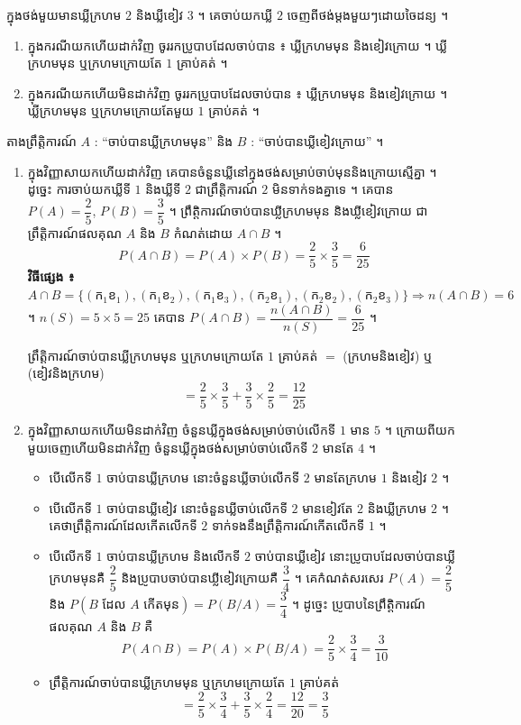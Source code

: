 \begin{example}[លំហាត់គំរូ]
ក្នុងថង់មួយមានឃ្លីក្រហម $2$ និងឃ្លីខៀវ $3$ ។ គេចាប់យកឃ្លី $2$ ចេញពីថង់ម្ដងមួយៗដោយចៃដន្យ ។
\begin{enumerate}[a]
  \item ក្នុងករណីយកហើយដាក់វិញ ចូររកប្រូបាបដែលចាប់បាន ៖ ឃ្លីក្រហមមុន និងខៀវក្រោយ ។ ឃ្លីក្រហមមុន ឬក្រហមក្រោយតែ $1$ គ្រាប់គត់ ។
  \item ក្នុងករណីយកហើយមិនដាក់វិញ ចូររកប្រូបាបដែលចាប់បាន ៖ ឃ្លីក្រហមមុន និងខៀវក្រោយ ។ ឃ្លីក្រហមមុន ឬក្រហមក្រោយតែមួយ $1$ គ្រាប់គត់ ។
\end{enumerate}
\ans
តាងព្រឹត្តិការណ៍ $A$ : “ចាប់បានឃ្លីក្រហមមុន” និង $B$ : “ចាប់បានឃ្លីខៀវក្រោយ” ។
\begin{enumerate}[a]
  \item ក្នុងវិញ្ញាសាយកហើយដាក់វិញ គេបានចំនួនឃ្លីនៅក្នុងថង់សម្រាប់ចាប់មុននិងក្រោយស្មើគ្នា ។ ដូច្នេះ ការចាប់យកឃ្លីទី $1$ និងឃ្លីទី $2$ ជាព្រឹត្តិការណ៍ $2$ មិនទាក់ទងគ្នាទេ ។ គេបាន $P(A) = \dfrac{2}{5}$, $P(B) = \dfrac{3}{5}$ ។ ព្រឹត្តិការណ៍ចាប់បានឃ្លីក្រហមមុន និងឃ្លីខៀវក្រោយ ជាព្រឹត្តិការណ៍ផលគុណ $A$ និង $B$ កំណត់ដោយ $A \cap B$ ។
  \[
  P(A \cap B) = P(A)\times P(B) = \frac{2}{5}\times\frac{3}{5} = \frac{6}{25}
  \]
  \textbf{វិធីផ្សេង ៖} $A \cap B = \{(\text{ក}_1\text{ខ}_1), (\text{ក}_1\text{ខ}_2), (\text{ក}_1\text{ខ}_3), (\text{ក}_2\text{ខ}_1), (\text{ក}_2\text{ខ}_2), (\text{ក}_2\text{ខ}_3)\} \Rightarrow n(A \cap B) = 6$ ។ $n(S) = 5\times 5 = 25$ គេបាន $P(A \cap B) = \dfrac{n(A \cap B)}{n(S)} = \dfrac{6}{25}$ ។

  ព្រឹត្តិការណ៍ចាប់បានឃ្លីក្រហមមុន ឬក្រហមក្រោយតែ $1$ គ្រាប់គត់ $=$ (ក្រហមនិងខៀវ) ឬ (ខៀវនិងក្រហម)
  \[
  = \frac{2}{5}\times\frac{3}{5} + \frac{3}{5}\times\frac{2}{5} = \frac{12}{25}
  \]
  \item ក្នុងវិញ្ញាសាយកហើយមិនដាក់វិញ ចំនួនឃ្លីក្នុងថង់សម្រាប់ចាប់លើកទី $1$ មាន $5$ ។ ក្រោយពីយកមួយចេញហើយមិនដាក់វិញ ចំនួនឃ្លីក្នុងថង់សម្រាប់ចាប់លើកទី $2$ មានតែ $4$ ។
  \begin{itemize}
    \item បើលើកទី $1$ ចាប់បានឃ្លីក្រហម នោះចំនួនឃ្លីចាប់លើកទី $2$ មានតែក្រហម $1$ និងខៀវ $2$ ។
    \item បើលើកទី $1$ ចាប់បានឃ្លីខៀវ នោះចំនួនឃ្លីចាប់លើកទី $2$ មានខៀវតែ $2$ និងឃ្លីក្រហម $2$ ។ គេថាព្រឹត្តិការណ៍ដែលកើតលើកទី $2$ ទាក់ទងនឹងព្រឹត្តិការណ៍កើតលើកទី $1$ ។
    \item បើលើកទី $1$ ចាប់បានឃ្លីក្រហម និងលើកទី $2$ ចាប់បានឃ្លីខៀវ នោះប្រូបាបដែលចាប់បានឃ្លីក្រហមមុនគឺ $\dfrac{2}{5}$ និងប្រូបាបចាប់បានឃ្លីខៀវក្រោយគឺ $\dfrac{3}{4}$ ។ គេកំណត់សរសេរ $P(A) = \dfrac{2}{5}$ និង $P(B \text{ ដែល } A \text{ កើតមុន}) = P(B/A) = \dfrac{3}{4}$ ។ ដូច្នេះ ប្រូបាបនៃព្រឹត្តិការណ៍ផលគុណ $A$ និង $B$ គឺ
    \[
    P(A \cap B) = P(A)\times P(B/A) = \frac{2}{5}\times\frac{3}{4} = \frac{3}{10}
    \]
    \item ព្រឹត្តិការណ៍ចាប់បានឃ្លីក្រហមមុន ឬក្រហមក្រោយតែ $1$ គ្រាប់គត់
    \[
    = \frac{2}{5}\times\frac{3}{4} + \frac{3}{5}\times\frac{2}{4} = \frac{12}{20} = \frac{3}{5}
    \]
  \end{itemize}
\end{enumerate}
\end{example}

